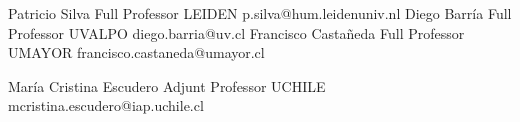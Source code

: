 





\begin{referees}
		{Patricio Silva}
		{Full Professor}
		{LEIDEN}
		{p.silva@hum.leidenuniv.nl}
		{Diego Barría}
		{Full Professor}
		{UVALPO}
		{diego.barria@uv.cl}
		{Francisco Castañeda}
		{Full Professor}
		{UMAYOR}
		{francisco.castaneda@umayor.cl}
\end{referees}

\begin{referees}
		{María Cristina Escudero}
		{Adjunt Professor}
		{UCHILE}
		{mcristina.escudero@iap.uchile.cl}
\end{referees}
